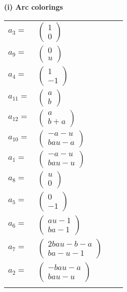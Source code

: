 \documentclass[1p]{elsarticle_modified}
\theoremstyle{definition}
\begin{document}
\flushleft \textbf{(i) Arc colorings}\\
\begin{tabular}{m{7pt} m{180pt} m{7pt} m{180pt} }
\flushright $a_{3}=$&$\begin{pmatrix}1\\0\end{pmatrix}$ \\
\flushright $a_{9}=$&$\begin{pmatrix}0\\u\end{pmatrix}$ \\
\flushright $a_{4}=$&$\begin{pmatrix}1\\-1\end{pmatrix}$ \\
\flushright $a_{11}=$&$\begin{pmatrix}a\\b\end{pmatrix}$ \\
\flushright $a_{12}=$&$\begin{pmatrix}a\\b+a\end{pmatrix}$ \\
\flushright $a_{10}=$&$\begin{pmatrix}- a- u\\b a u- a\end{pmatrix}$ \\
\flushright $a_{1}=$&$\begin{pmatrix}- a- u\\b a u- u\end{pmatrix}$ \\
\flushright $a_{8}=$&$\begin{pmatrix}u\\0\end{pmatrix}$ \\
\flushright $a_{5}=$&$\begin{pmatrix}0\\-1\end{pmatrix}$ \\
\flushright $a_{6}=$&$\begin{pmatrix}a u-1\\b a-1\end{pmatrix}$ \\
\flushright $a_{7}=$&$\begin{pmatrix}2 b a u- b- a\\b a- u-1\end{pmatrix}$ \\
\flushright $a_{2}=$&$\begin{pmatrix}- b a u- a\\b a u- u\end{pmatrix}$\\&\end{tabular}
\end{document}
